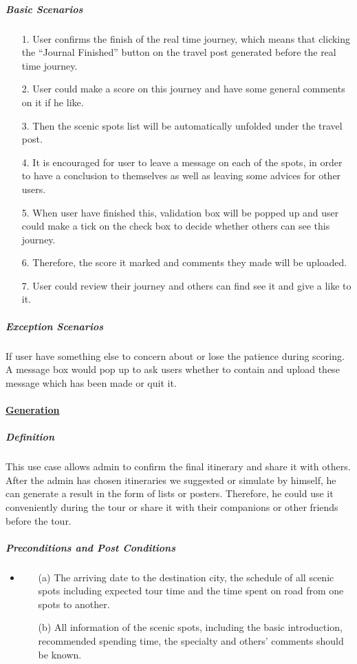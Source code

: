 \documentclass[10pt]{article}
\begin{document}
\begin{itemize}
		\subparagraph{Basic Scenarios}
		\begin{itemize}
			\item[1.] User confirms the finish of the real time journey, which means that clicking the “Journal Finished” button on the travel post generated before the real time journey.
			\item[2.]User could make a score on this journey and have some general comments on it if he like.
			\item[3.]Then the scenic spots list will be automatically unfolded under the travel post.
			\item[4.]It is encouraged for user to leave a message on each of the spots, in order to have a conclusion to themselves as well as leaving some advices for other users.
			\item[5.]When user have finished this, validation box will be popped up and user could make a tick on the check box to decide whether others can see this journey.
			\item[6.]Therefore, the score it marked and comments they made will be uploaded.
			\item[7.]User could review their journey and others can find see it and give a like to it.
			
		 \end{itemize}
		 
		 \subparagraph{Exception Scenarios}
		 If user have something else to concern about or lose the patience during scoring. A message box would pop up to ask users whether to contain and upload these message which has been made or quit it.

		 \paragraph{\underline{Generation}}
		 \subparagraph{Definition}
		 This use case allows admin to confirm the final itinerary and share it with others. After the admin has chosen itineraries we suggested or simulate by himself, he can generate a result in the form of lists or posters. Therefore, he could use it conveniently during the tour or share it with their companions or other friends before the tour.

		 \subparagraph{Preconditions and Post Conditions}
		 \begin{itemize}
			 \item \begin{itemize}
				 \item[(a)] The arriving date to the destination city, the schedule of all scenic spots including expected tour time and the time spent on road from one spots to another.
				 \item[(b)] All information of the scenic spots, including the basic introduction, recommended spending time, the specialty and others’ comments should be known. 
			 \end{itemize}


\end{itemize}
\end{itemize}
\end{document}
